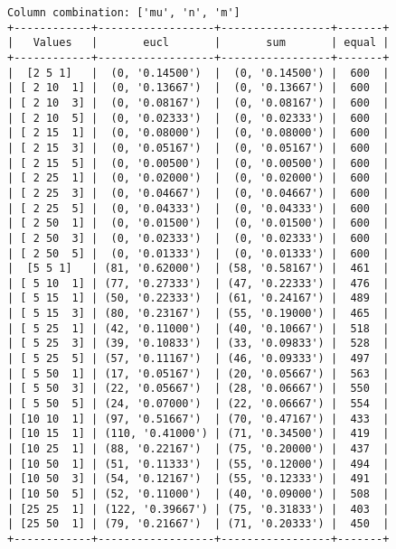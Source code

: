 \documentclass{article}
\begin{document}
\begin{verbatim}
Column combination: ['mu', 'n', 'm']
+------------+------------------+-----------------+-------+
|   Values   |       eucl       |       sum       | equal |
+------------+------------------+-----------------+-------+
|  [2 5 1]   |  (0, '0.14500')  |  (0, '0.14500') |  600  |
| [ 2 10  1] |  (0, '0.13667')  |  (0, '0.13667') |  600  |
| [ 2 10  3] |  (0, '0.08167')  |  (0, '0.08167') |  600  |
| [ 2 10  5] |  (0, '0.02333')  |  (0, '0.02333') |  600  |
| [ 2 15  1] |  (0, '0.08000')  |  (0, '0.08000') |  600  |
| [ 2 15  3] |  (0, '0.05167')  |  (0, '0.05167') |  600  |
| [ 2 15  5] |  (0, '0.00500')  |  (0, '0.00500') |  600  |
| [ 2 25  1] |  (0, '0.02000')  |  (0, '0.02000') |  600  |
| [ 2 25  3] |  (0, '0.04667')  |  (0, '0.04667') |  600  |
| [ 2 25  5] |  (0, '0.04333')  |  (0, '0.04333') |  600  |
| [ 2 50  1] |  (0, '0.01500')  |  (0, '0.01500') |  600  |
| [ 2 50  3] |  (0, '0.02333')  |  (0, '0.02333') |  600  |
| [ 2 50  5] |  (0, '0.01333')  |  (0, '0.01333') |  600  |
|  [5 5 1]   | (81, '0.62000')  | (58, '0.58167') |  461  |
| [ 5 10  1] | (77, '0.27333')  | (47, '0.22333') |  476  |
| [ 5 15  1] | (50, '0.22333')  | (61, '0.24167') |  489  |
| [ 5 15  3] | (80, '0.23167')  | (55, '0.19000') |  465  |
| [ 5 25  1] | (42, '0.11000')  | (40, '0.10667') |  518  |
| [ 5 25  3] | (39, '0.10833')  | (33, '0.09833') |  528  |
| [ 5 25  5] | (57, '0.11167')  | (46, '0.09333') |  497  |
| [ 5 50  1] | (17, '0.05167')  | (20, '0.05667') |  563  |
| [ 5 50  3] | (22, '0.05667')  | (28, '0.06667') |  550  |
| [ 5 50  5] | (24, '0.07000')  | (22, '0.06667') |  554  |
| [10 10  1] | (97, '0.51667')  | (70, '0.47167') |  433  |
| [10 15  1] | (110, '0.41000') | (71, '0.34500') |  419  |
| [10 25  1] | (88, '0.22167')  | (75, '0.20000') |  437  |
| [10 50  1] | (51, '0.11333')  | (55, '0.12000') |  494  |
| [10 50  3] | (54, '0.12167')  | (55, '0.12333') |  491  |
| [10 50  5] | (52, '0.11000')  | (40, '0.09000') |  508  |
| [25 25  1] | (122, '0.39667') | (75, '0.31833') |  403  |
| [25 50  1] | (79, '0.21667')  | (71, '0.20333') |  450  |
+------------+------------------+-----------------+-------+
\end{verbatim}
\end{document}
